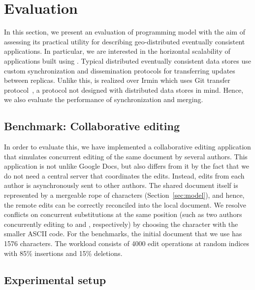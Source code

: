\section{Evaluation}
\label{sec:evaluation}

In this section, we present an evaluation of \name programming model
with the aim of assessing its practical utility for describing
geo-distributed eventually consistent applications. In particular, we
are interested in the horizontal scalability of applications built
using \name. Typical distributed eventually consistent data stores use
custom synchronization and dissemination protocols for transferring
updates between replicas. Unlike this, \name is realized over Irmin
which uses Git transfer protocol~\cite{..}, a protocol not designed
with distributed data stores in mind. Hence, we also evaluate the
performance of synchronization and merging.

\subsection{Benchmark: Collaborative editing}

In order to evaluate this, we have implemented a collaborative editing
application that simulates concurrent editing of the same document by several
authors. This application is not unlike Google Docs, but also differs from it
by the fact that we do not need a central server that coordinates the edits.
Instead, edits from each author is asynchronously sent to other authors. The
shared document itself is represented by a mergeable rope of characters
(Section~\ref{sec:model}), and hence, the remote edits can be correctly
reconciled into the local document. We resolve conflicts on concurrent
substitutions at the same position (such as two authors concurrently editing
 to  and , respectively) by choosing the character
with the smaller ASCII code. For the benchmarks, the initial document that we
use has 1576 characters. The workload consists of 4000 edit operations at
random indices with 85\% insertions and 15\% deletions.

\subsection{Experimental setup}

